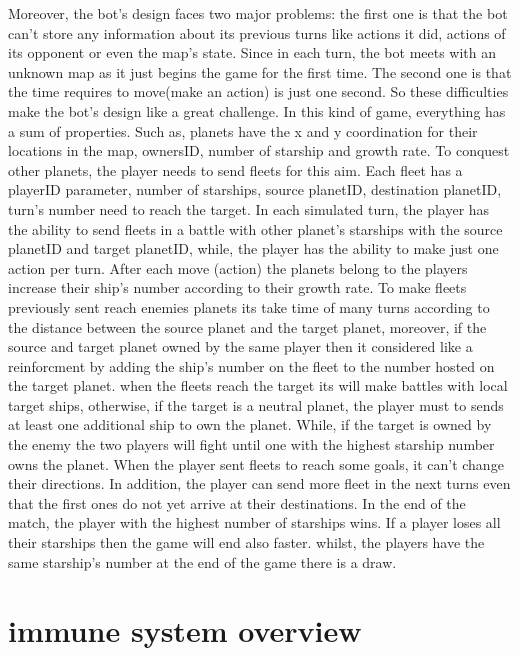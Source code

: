 \documentclass[conference]{IEEEtran}
\begin{document}
Moreover, the bot's design faces two major problems: the first one \cite{doc1} is that the bot can't store any information about its previous turns like actions it did, actions of its opponent or even the map's state. Since in each turn, the bot meets with an unknown map as it just begins the game for the first time. The second one\cite{doc3} is that the time requires to move(make an action) is just one second. So these difficulties make the bot's design like a great challenge. In this kind of game, everything has a sum of properties\cite{doc1}. Such as, planets have the x and y coordination for their locations in the map, ownersID, number of starship and growth rate. To conquest other planets, the player needs to send fleets for this aim. Each fleet has a playerID parameter, number of starships, source planetID, destination planetID, turn's number need to reach the target. In each simulated turn\cite{doc1}, the player has the ability to send fleets in a battle with other planet's starships with the source planetID and target planetID, while, the player has the ability\cite{doc1} to make just one action per turn. After each move (action) the planets belong to the players\cite{doc5} increase their ship's number according to their growth rate. To make fleets previously sent reach enemies planets its take time of many turns according to the distance between the source planet and the target planet, moreover, if the source and target planet owned by the same player then it considered like a reinforcment\cite{doc1,doc5} by adding the ship's number on the fleet to the number hosted on the target planet. when the fleets reach the target its will make battles with local target ships, otherwise, if the target is a neutral planet, the player must to sends at least one additional ship to own the planet. While, if the target is owned by the enemy the two players will fight until one with the highest starship number owns the planet. When the player sent fleets to reach some goals\cite{doc5}, it can't change their directions. In addition, the player can send more fleet in the next turns even that the first ones do not yet arrive at their destinations. In the end of the match\cite{doc5}, the player with the highest number of starships wins. If a player loses all their starships then the game will end also faster. whilst, the players have the same starship's number at the end of the game there is a draw\cite{doc5}. 
\section{immune system overview}
\end{document}
